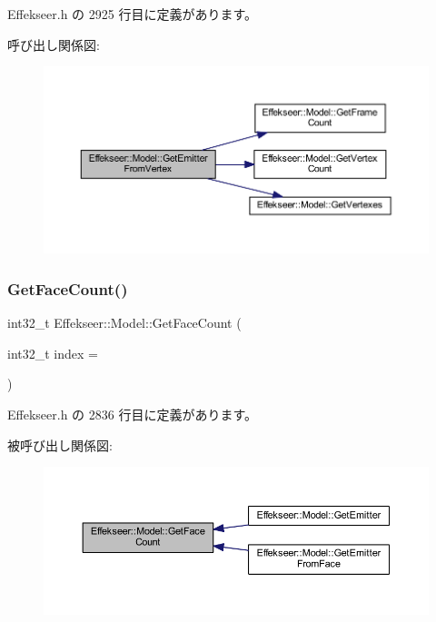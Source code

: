  Effekseer.\+h の 2925 行目に定義があります。

呼び出し関係図\+:\nopagebreak
\begin{figure}[H]
\begin{center}
\leavevmode
\includegraphics[width=350pt]{class_effekseer_1_1_model_a0cdeb0635f63e2697bb82f74c8c40aef_cgraph}
\end{center}
\end{figure}
\mbox{\label{class_effekseer_1_1_model_af97bcb7a69056a947dc539d9c4af131b}} 
\subsubsection{\texorpdfstring{Get\+Face\+Count()}{GetFaceCount()}}
{\footnotesize\ttfamily int32\+\_\+t Effekseer\+::\+Model\+::\+Get\+Face\+Count (\begin{DoxyParamCaption}\item[{int32\+\_\+t}]{index = {} }\end{DoxyParamCaption})\hspace{0.3cm}{\ttfamily [inline]}}



 Effekseer.\+h の 2836 行目に定義があります。

被呼び出し関係図\+:\nopagebreak
\begin{figure}[H]
\begin{center}
\leavevmode
\includegraphics[width=350pt]{class_effekseer_1_1_model_af97bcb7a69056a947dc539d9c4af131b_icgraph}
\end{center}
\end{figure}
\mbox{\label{class_effekseer_1_1_model_aca53194432e229643e98ecfd9b3d9db9}} 
